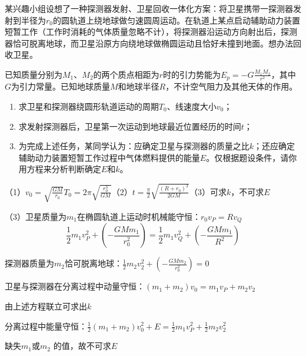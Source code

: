 某兴趣小组设想了一种探测器发射、卫星回收一体化方案：将卫星携带一探测器发射到半径为\(r_0\)的圆轨道上绕地球做匀速圆周运动。在轨道上某点启动辅助动力装置短暂工作（工作时消耗的气体质量忽略不计），将探测器沿运动方向射出后，探测器恰可脱离地球，而卫星沿原方向绕地球做椭圆运动且恰好未撞到地面。想办法回收卫星。

\noindent 已知质量分别为\(M_1\)、\(M_2\)的两个质点相距为\(r\)时的引力势能为\(E_p = - G \frac{M_1M_2}{r^2}\)，其中\(G\)为引力常量。已知地球质量\(M\)和地球半径\(R\)，不计空气阻力及其他天体的作用。
\begin{enumerate}
    \item 求卫星和探测器绕圆形轨道运动的周期\(T_0\)、线速度大小\(v_0\)；
    \item 求发射探测器后，卫星第一次运动到地球最近位置经历的时间\(t\)；
    \item 为完成上述任务，某同学认为：应确定卫星与探测器的质量之比\(k\)；还应确定辅助动力装置短暂工作过程中气体燃料提供的能量\(E\)。仅根据题设条件，请你用方程来分析判断确定\(E\)和\(k\)。
\end{enumerate}
\begin{answer}
    （1）\(v_0 = \sqrt{\frac{GM}{r_0}}\)\quad \(T_0 = 2\pi \sqrt{\frac{r_0^3}{GM}}\)（2）\(t = \frac{\pi}{2} \sqrt{\frac{(R + r_0)^3}{2GM}}\)（3）可求\(k\)，不可求\(E\)


    （3）卫星质量为\(m_1\)在椭圆轨道上运动时机械能守恒：\(r_0 v_P = R v_Q\)
    \[
        \frac{1}{2}m_1 v_P^2 +( -  \frac{GMm_1}{r_0^2}) = \frac{1}{2}m_1 v_Q^2 +( - \frac{GMm_1}{R^2})
    \]

    探测器质量为\(m_2\)恰可脱离地球：\(\frac{1}{2}m_2 v_2^2 + (- \frac{GMm_2}{r_0^2}) = 0\)

    卫星与探测器在分离过程中动量守恒：\((m_1 + m_2)v_0 = m_1 v_P + m_2v_2\)

    由上述方程联立可求出\(k\)

    分离过程中能量守恒：\(\frac{1}{2}(m_1 + m_2)v_0^2 + E = \frac{1}{2}m_1 v_P^2 + \frac{1}{2}m_2 v_2^2\)

    缺失\(m_1\)或\(m_2\) 的值，故不可求\(E\)
\end{answer}